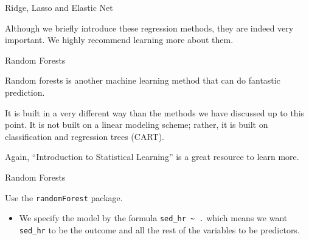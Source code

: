 \begin{frame}{Ridge, Lasso and Elastic Net}

Although we briefly introduce these regression methods, they are indeed
very important. We highly recommend learning more about them.

\end{frame}

\begin{frame}{Random Forests}

Random forests is another machine learning method that can do fantastic
prediction.

It is built in a very different way than the methods we have discussed
up to this point. It is not built on a linear modeling scheme; rather,
it is built on classification and regression trees (CART).

Again, ``Introduction to Statistical Learning'' is a great resource to
learn more.

\end{frame}

\begin{frame}[fragile]{Random Forests}

Use the \texttt{randomForest} package.

\begin{itemize}
\tightlist
\item
  We specify the model by the formula
  \texttt{sed\_hr\ \textasciitilde{}\ .} which means we want
  \texttt{sed\_hr} to be the outcome and all the rest of the variables
  to be predictors.
\end{itemize}

\begin{Shaded}
\begin{Highlighting}[]

\StringTok{ }\OperatorTok{~}\StringTok{ }
\end{Highlighting}
\end{Shaded}

\end{frame}

